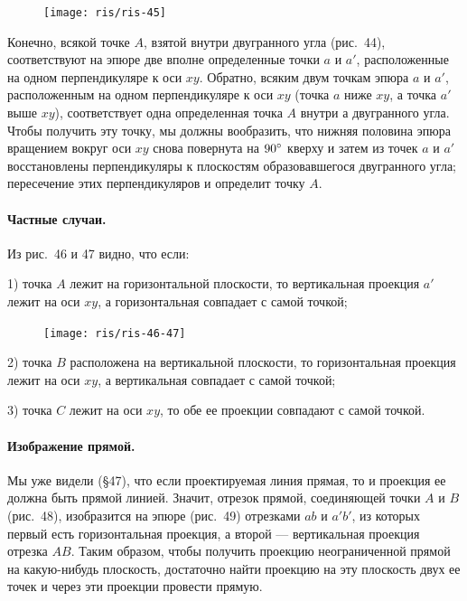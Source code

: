 \documentclass[twoside]{book}
\begin{document}
\begin{figure}[h!]
\centering
\texttt{[image: ris/ris-45]}
\caption{}
\end{figure}

Конечно, всякой точке $A$, взятой внутри двугранного угла (рис.~44), соответствуют на эпюре две вполне определенные точки $a$ и $a'$, расположенные на одном перпендикуляре к оси $xy$.
Обратно, всяким двум точкам эпюра $a$ и $a'$, расположенным на одном перпендикуляре к оси $xy$ (точка $a$ ниже $xy$, а точка $a'$ выше $xy$), соответствует одна определенная точка $A$ внутри а двугранного угла.
Чтобы получить эту точку, мы должны вообразить, что нижняя половина эпюра вращением вокруг оси $xy$ снова повернута на $90\degree$ кверху и затем из точек $a$ и $a'$ восстановлены перпендикуляры к плоскостям образовавшегося двугранного угла;
пересечение этих перпендикуляров и определит точку $A$.

\paragraph{Частные случаи.}\label{1938/s55}
Из рис.~46 и 47 видно, что если:

1) точка $A$ лежит на горизонтальной плоскости, то вертикальная проекция $a'$ лежит на оси $xy$, а горизонтальная совпадает с самой точкой;

\begin{figure}[h!]
\centering
\texttt{[image: ris/ris-46-47]}
\caption{}
\end{figure}

2) точка $B$ расположена на вертикальной плоскости, то горизонтальная проекция лежит на оси $xy$, а вертикальная совпадает с самой точкой;

3) точка $C$ лежит на оси $xy$, то обе ее проекции совпадают с самой точкой.

\paragraph{Изображение прямой.}\label{1938/s56}
Мы уже видели (§47), что если проектируемая линия прямая, то и проекция ее должна быть прямой линией.
Значит, отрезок прямой, соединяющей точки $A$ и $B$ (рис.~48), изобразится на эпюре (рис.~49) отрезками $ab$ и $a'b'$, из которых первый есть горизонтальная проекция, а второй --- вертикальная проекция отрезка $AB$.
Таким образом, чтобы получить проекцию неограниченной прямой на какую-нибудь плоскость, достаточно найти проекцию на эту плоскость двух ее точек и через эти проекции провести прямую.
\end{document}
